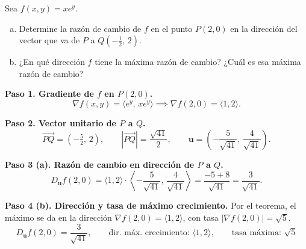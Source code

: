 \begin{example}
Sea $f(x,y) = x e^y$.
\begin{enumerate}[a)]
    \item Determine la razón de cambio de $f$ en el punto $P(2,0)$ en la
    dirección del vector que va de $P$ a $Q\left(-\frac12,\,2\right)$.
    \item ¿En qué dirección $f$ tiene la máxima razón de cambio?
    ¿Cuál es esa máxima razón de cambio?
\end{enumerate}
\begin{myproof}
\textbf{Paso 1. Gradiente de $f$ en $P(2,0)$.}
\[
\nabla f(x,y) = \langle e^y,\, x e^y \rangle
\implies \nabla f(2,0) = \langle 1, 2 \rangle.
\]

\textbf{Paso 2. Vector unitario de $P$ a $Q$.}
\[
\overrightarrow{PQ} = \left(-\tfrac{5}{2},\,2\right),\qquad
|\overrightarrow{PQ}|=\frac{\sqrt{41}}{2},\qquad
\mathbf{u}=\left(-\frac{5}{\sqrt{41}},\,\frac{4}{\sqrt{41}}\right).
\]

\textbf{Paso 3 (a). Razón de cambio en dirección de $P$ a $Q$.}
\[
D_{\mathbf{u}} f(2,0)
=\langle 1,2\rangle\cdot\left\langle-\frac{5}{\sqrt{41}},\,\frac{4}{\sqrt{41}}\right\rangle
=\frac{-5+8}{\sqrt{41}}=\frac{3}{\sqrt{41}}.
\]

\textbf{Paso 4 (b). Dirección y tasa de máximo crecimiento.}
Por el teorema, el máximo se da en la dirección $\nabla f(2,0)=\langle 1,2\rangle$, con tasa $|\nabla f(2,0)|=\sqrt{5}$.
\[
\boxed{D_{\mathbf{u}} f(2,0)=\frac{3}{\sqrt{41}},\qquad
\text{dir. máx. crecimiento: }\langle 1,2\rangle,\qquad
\text{tasa máxima: }\sqrt{5}}
\]
\end{myproof}
\end{example}


